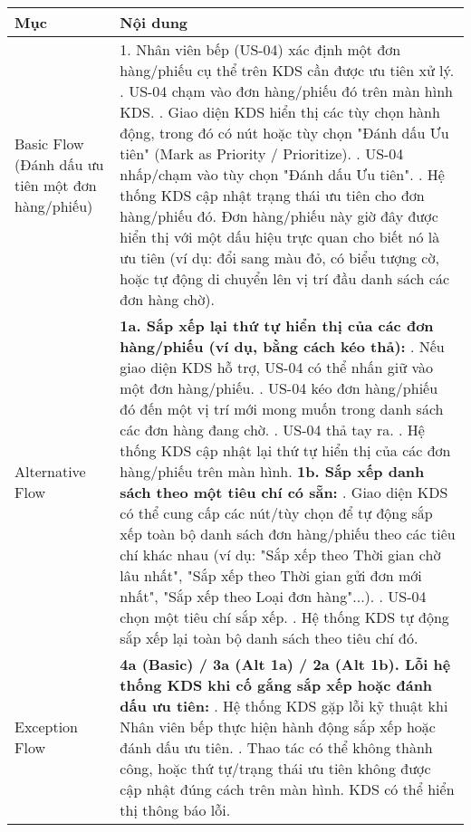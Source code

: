 \begin{longtable}{|m{4cm}|p{11cm}|}
\hline
\textbf{Mục} & \textbf{Nội dung} \\
\hline
Basic Flow (Đánh dấu ưu tiên một đơn hàng/phiếu) & 1. Nhân viên bếp (US-04) xác định một đơn hàng/phiếu cụ thể trên KDS cần được ưu tiên xử lý. \newline 2. US-04 chạm vào đơn hàng/phiếu đó trên màn hình KDS. \newline 3. Giao diện KDS hiển thị các tùy chọn hành động, trong đó có nút hoặc tùy chọn "Đánh dấu Ưu tiên" (Mark as Priority / Prioritize). \newline 4. US-04 nhấp/chạm vào tùy chọn "Đánh dấu Ưu tiên". \newline 5. Hệ thống KDS cập nhật trạng thái ưu tiên cho đơn hàng/phiếu đó. Đơn hàng/phiếu này giờ đây được hiển thị với một dấu hiệu trực quan cho biết nó là ưu tiên (ví dụ: đổi sang màu đỏ, có biểu tượng cờ, hoặc tự động di chuyển lên vị trí đầu danh sách các đơn hàng chờ). \\
\hline
Alternative Flow & \textbf{1a. Sắp xếp lại thứ tự hiển thị của các đơn hàng/phiếu (ví dụ, bằng cách kéo thả):} \newline    1. Nếu giao diện KDS hỗ trợ, US-04 có thể nhấn giữ vào một đơn hàng/phiếu. \newline    2. US-04 kéo đơn hàng/phiếu đó đến một vị trí mới mong muốn trong danh sách các đơn hàng đang chờ. \newline    3. US-04 thả tay ra. \newline    4. Hệ thống KDS cập nhật lại thứ tự hiển thị của các đơn hàng/phiếu trên màn hình. \newline \textbf{1b. Sắp xếp danh sách theo một tiêu chí có sẵn:} \newline    1. Giao diện KDS có thể cung cấp các nút/tùy chọn để tự động sắp xếp toàn bộ danh sách đơn hàng/phiếu theo các tiêu chí khác nhau (ví dụ: "Sắp xếp theo Thời gian chờ lâu nhất", "Sắp xếp theo Thời gian gửi đơn mới nhất", "Sắp xếp theo Loại đơn hàng"...). \newline    2. US-04 chọn một tiêu chí sắp xếp. \newline    3. Hệ thống KDS tự động sắp xếp lại toàn bộ danh sách theo tiêu chí đó. \\
\hline
Exception Flow & \textbf{4a (Basic) / 3a (Alt 1a) / 2a (Alt 1b). Lỗi hệ thống KDS khi cố gắng sắp xếp hoặc đánh dấu ưu tiên:} \newline    1. Hệ thống KDS gặp lỗi kỹ thuật khi Nhân viên bếp thực hiện hành động sắp xếp hoặc đánh dấu ưu tiên. \newline    2. Thao tác có thể không thành công, hoặc thứ tự/trạng thái ưu tiên không được cập nhật đúng cách trên màn hình. KDS có thể hiển thị thông báo lỗi. \\

\end{longtable}
